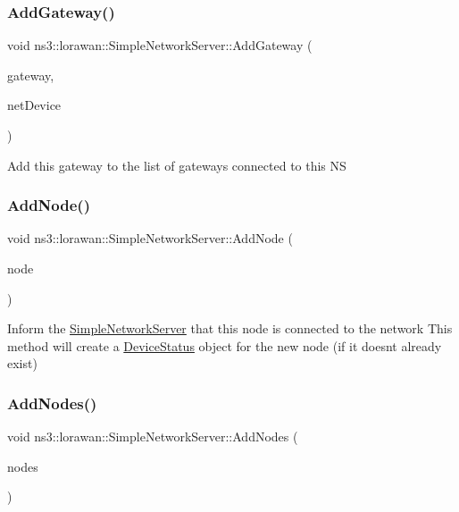 \subsubsection{\texorpdfstring{Add\+Gateway()}{AddGateway()}}
{\footnotesize\ttfamily void ns3\+::lorawan\+::\+Simple\+Network\+Server\+::\+Add\+Gateway (\begin{DoxyParamCaption}\item[{Ptr$<$ Node $>$}]{gateway,  }\item[{Ptr$<$ \hyperlink{classNetDevice}{Net\+Device} $>$}]{net\+Device }\end{DoxyParamCaption})}

Add this gateway to the list of gateways connected to this NS \mbox{\label{classns3_1_1lorawan_1_1SimpleNetworkServer_ad1cb1d6e83af9a6ee38fd0481a94cd36}} 
\subsubsection{\texorpdfstring{Add\+Node()}{AddNode()}}
{\footnotesize\ttfamily void ns3\+::lorawan\+::\+Simple\+Network\+Server\+::\+Add\+Node (\begin{DoxyParamCaption}\item[{Ptr$<$ Node $>$}]{node }\end{DoxyParamCaption})}

Inform the \hyperlink{classns3_1_1lorawan_1_1SimpleNetworkServer}{Simple\+Network\+Server} that this node is connected to the network This method will create a \hyperlink{classns3_1_1lorawan_1_1DeviceStatus}{Device\+Status} object for the new node (if it doesn\textquotesingle{}t already exist) \mbox{\label{classns3_1_1lorawan_1_1SimpleNetworkServer_a52ff4184ec4b21340772cdcb22ac9b79}} 
\subsubsection{\texorpdfstring{Add\+Nodes()}{AddNodes()}}
{\footnotesize\ttfamily void ns3\+::lorawan\+::\+Simple\+Network\+Server\+::\+Add\+Nodes (\begin{DoxyParamCaption}\item[{Node\+Container}]{nodes }\end{DoxyParamCaption})}

